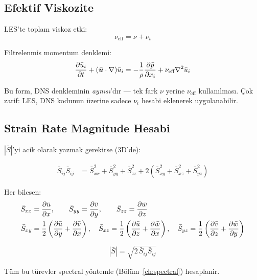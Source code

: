 \subsection{Efektif Viskozite}

LES'te toplam viskoz etki:
\begin{equation}
\nu_{\text{eff}} = \nu + \nu_t
\label{eq:nu_eff}
\end{equation}

Filtrelenmis momentum denklemi:
\begin{equation}
\frac{\partial \bar{u}_i}{\partial t} + (\bar{\bm{u}}\cdot\nabla)\bar{u}_i = -\frac{1}{\rho}\frac{\partial \bar{p}}{\partial x_i} + \nu_{\text{eff}}\nabla^2\bar{u}_i
\label{eq:les_effective}
\end{equation}

Bu form, DNS denkleminin \emph{aynısı}'dır --- tek fark $\nu$ yerine $\nu_{\text{eff}}$ kullanılması. Çok zarif: LES, DNS kodunun üzerine sadece $\nu_t$ hesabi eklenerek uygulanabilir.

\subsection{Strain Rate Magnitude Hesabi}

$|\bar{S}|$'yi acik olarak yazmak gerekirse (3D'de):

\begin{align}
\bar{S}_{ij}\bar{S}_{ij} &= \bar{S}_{xx}^2 + \bar{S}_{yy}^2 + \bar{S}_{zz}^2 + 2(\bar{S}_{xy}^2 + \bar{S}_{xz}^2 + \bar{S}_{yz}^2) \label{eq:sij_sij}
\end{align}

Her bilesen:
\begin{align}
\bar{S}_{xx} &= \frac{\partial \bar{u}}{\partial x}, \qquad \bar{S}_{yy} = \frac{\partial \bar{v}}{\partial y}, \qquad \bar{S}_{zz} = \frac{\partial \bar{w}}{\partial z} \\
\bar{S}_{xy} &= \frac{1}{2}\left(\frac{\partial \bar{u}}{\partial y}+\frac{\partial \bar{v}}{\partial x}\right), \quad
\bar{S}_{xz} = \frac{1}{2}\left(\frac{\partial \bar{u}}{\partial z}+\frac{\partial \bar{w}}{\partial x}\right), \quad
\bar{S}_{yz} = \frac{1}{2}\left(\frac{\partial \bar{v}}{\partial z}+\frac{\partial \bar{w}}{\partial y}\right)
\end{align}

\begin{equation}
|\bar{S}| = \sqrt{2\,\bar{S}_{ij}\bar{S}_{ij}}
\label{eq:strain_mag}
\end{equation}

Tüm bu türevler spectral yöntemle (Bölüm~\ref{ch:spectral}) hesaplanir.



